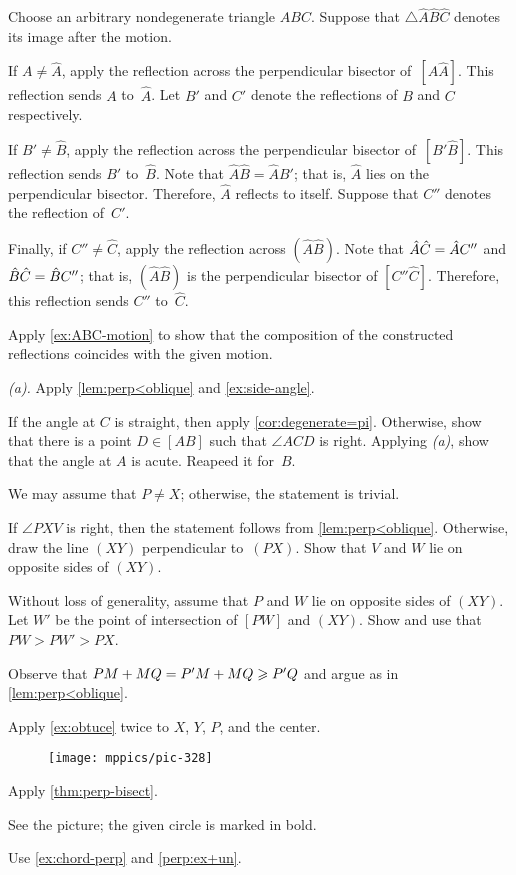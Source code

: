 Choose an arbitrary nondegenerate triangle $ABC$.
Suppose that $\triangle \hat A \hat B\hat C$ denotes its image after the motion.

If $A\ne \hat A$, apply the reflection across the perpendicular bisector of~$[A\hat A]$.
This reflection sends $A$ to~$\hat A$.
Let $B'$ and $C'$ denote the reflections of $B$ and $C$ respectively.

If $B'\ne \hat B$, apply the reflection across the perpendicular bisector of~$[B'\hat B]$.
This reflection sends $B'$ to~$\hat B$.
Note that $\hat A\hat B=\hat AB'$;
that is, $\hat A$ lies on the perpendicular bisector. 
Therefore, $\hat A$ reflects to itself.
Suppose that $C''$ denotes the reflection of~$C'$.

Finally, if $C''\ne \hat C$, apply the reflection across $(\hat A\hat B)$.
Note that $\hat A\hat C=\hat AC''$ and $\hat B\hat C=\hat BC''$;
that is, $(\hat A\hat B)$ is the perpendicular bisector of $[C''\hat C]$.
Therefore, this reflection sends $C''$ to~$\hat C$.

Apply \ref{ex:ABC-motion} to show that the composition of the constructed reflections coincides with the given motion.

\textit{(a).} Apply \ref{lem:perp<oblique} and \ref{ex:side-angle}.

 If the angle at $C$ is straight, then apply \ref{cor:degenerate=pi}.
Otherwise, show that there is a point $D\in [AB]$ such that $\angle ACD$ is right.
Applying \textit{(a)}, show that the angle at $A$ is acute. Reapeed it for~$B$.

We may assume that $P \ne X$; otherwise, the statement is trivial.

If $\angle PXV$ is right, then the statement follows from \ref{lem:perp<oblique}.
Otherwise, draw the line $(XY)$ perpendicular to~$(PX)$.
Show that $V$ and $W$ lie on opposite sides of $(XY)$.

Without loss of generality, assume that $P$ and $W$ lie on opposite sides of $(XY)$.
Let $W'$ be the point of intersection of $[PW]$ and $(XY)$.
Show and use that $PW>PW'>PX$.

Observe that $PM+MQ=P'M+MQ\geqslant P'Q$ and argue as in \ref{lem:perp<oblique}.



Apply \ref{ex:obtuce} twice to $X$, $Y$, $P$, and the center.

{

\begin{wrapfigure}[6]{r}{27mm}
\vskip-6mm
\centering
\texttt{[image: mppics/pic-328]}
\end{wrapfigure}

 Apply \ref{thm:perp-bisect}.

See the picture; the given circle is marked in bold.

 Use \ref{ex:chord-perp} and \ref{perp:ex+un}.

}

